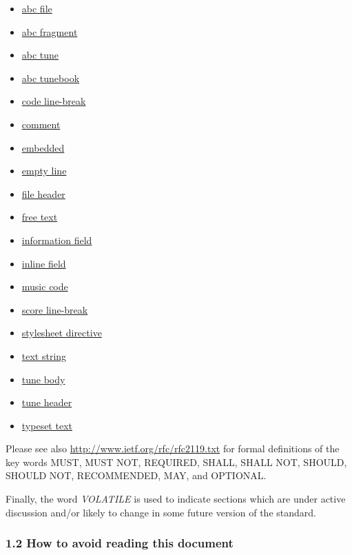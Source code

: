 \documentclass[oneside]{book}
\begin{document}
\begin{itemize}
\item
  \protect\hyperlink{abc_file_definition}{abc file}
\item
  \protect\hyperlink{abc_fragment_definition}{abc fragment}
\item
  \protect\hyperlink{abc_tune_definition}{abc tune}
\item
  \protect\hyperlink{abc_tunebook_definition}{abc tunebook}
\item
  \protect\hyperlink{code_line-break_definition}{code line-break}
\item
  \protect\hyperlink{comment_definition}{comment}
\item
  \protect\hyperlink{embedded_definition}{embedded}
\item
  \protect\hyperlink{empty_line_definition}{empty line}
\item
  \protect\hyperlink{file_header_definition}{file header}
\item
  \protect\hyperlink{free_text_definition}{free text}
\item
  \protect\hyperlink{information_field_definition}{information field}
\item
  \protect\hyperlink{inline_field_definition}{inline field}
\item
  \protect\hyperlink{music_code_definition}{music code}
\item
  \protect\hyperlink{score_line-break_definition}{score line-break}
\item
  \protect\hyperlink{stylesheet_directive_definition}{stylesheet
  directive}
\item
  \protect\hyperlink{text_string_definition}{text string}
\item
  \protect\hyperlink{tune_body_definition}{tune body}
\item
  \protect\hyperlink{tune_header_definition}{tune header}
\item
  \protect\hyperlink{typeset_text_definition}{typeset text}
\end{itemize}

Please see also \url{http://www.ietf.org/rfc/rfc2119.txt} for formal
definitions of the key words MUST, MUST NOT, REQUIRED, SHALL, SHALL NOT,
SHOULD, SHOULD NOT, RECOMMENDED, MAY, and OPTIONAL.

Finally, the word \emph{VOLATILE} is used to indicate sections which are
under active discussion and/or likely to change in some future version
of the standard.

\hypertarget{how_to_avoid_reading_this_document}{\subsubsection{1.2 How
to avoid reading this
document}\label{how_to_avoid_reading_this_document}}
\end{document}
